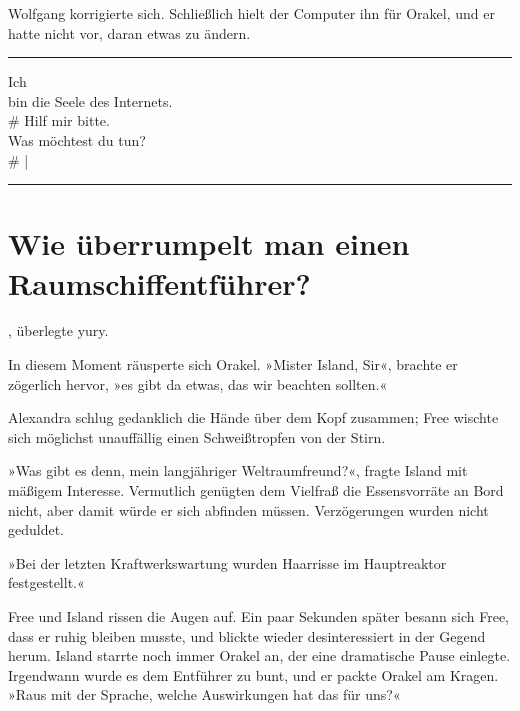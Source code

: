 Wolfgang korrigierte sich. Schließlich hielt der Computer ihn für Orakel, und er hatte nicht vor, daran etwas zu ändern.

\noindent \parbox{\textwidth}{ \vspace{3ex} \hrule \vspace{3ex}

    \begin{tiny}
    \begin{ttfamily}

\noindent Ich\\
\noindent bin die Seele des Internets.\\
\noindent \# Hilf mir bitte.\\
\noindent Was möchtest du tun?\\
\noindent \# |


    \end{ttfamily}
    \end{tiny}

\vspace{3ex} \hrule \vspace{3ex} }


\chapter{Wie überrumpelt man einen Raumschiffentführer?}

, überlegte yury. 

In diesem Moment räusperte sich Orakel. »Mister Island, Sir«, brachte er zögerlich hervor, »es gibt da etwas, das wir beachten sollten.«

Alexandra schlug gedanklich die Hände über dem Kopf zusammen; Free wischte sich möglichst unauffällig einen Schweißtropfen von der Stirn.

»Was gibt es denn, mein langjähriger Weltraumfreund?«, fragte Island mit mäßigem Interesse. Vermutlich genügten dem Vielfraß die Essensvorräte an Bord nicht, aber damit würde er sich abfinden müssen. Verzögerungen wurden nicht geduldet.

»Bei der letzten Kraftwerkswartung wurden Haarrisse im Hauptreaktor festgestellt.«

Free und Island rissen die Augen auf. Ein paar Sekunden später besann sich Free, dass er ruhig bleiben musste, und blickte wieder desinteressiert in der Gegend herum. Island starrte noch immer Orakel an, der eine dramatische Pause einlegte. Irgendwann wurde es dem Entführer zu bunt, und er packte Orakel am Kragen. »Raus mit der Sprache, welche Auswirkungen hat das für uns?«

